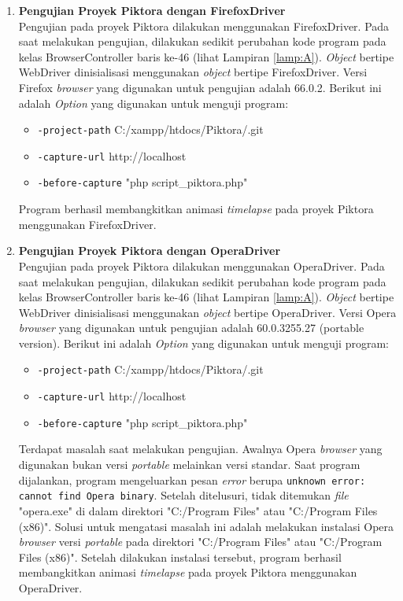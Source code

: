 \begin{enumerate}
\item \textbf{Pengujian Proyek Piktora dengan FirefoxDriver}\\
Pengujian pada proyek Piktora dilakukan menggunakan FirefoxDriver. Pada saat melakukan pengujian, dilakukan sedikit perubahan kode program pada kelas BrowserController baris ke-46 (lihat Lampiran \ref{lamp:A}). \textit{Object} bertipe WebDriver dinisialisasi menggunakan \textit{object} bertipe FirefoxDriver. Versi Firefox \textit{browser} yang digunakan untuk pengujian adalah 66.0.2. Berikut ini adalah \textit{Option} yang digunakan untuk menguji program:
\begin{itemize}
\item \texttt{-project-path} C:/xampp/htdocs/Piktora/.git
\item \texttt{-capture-url} http://localhost
\item \texttt{-before-capture} "php script\_piktora.php"
\end{itemize}
Program berhasil membangkitkan animasi \textit{timelapse} pada proyek Piktora menggunakan FirefoxDriver.


\item \textbf{Pengujian Proyek Piktora dengan OperaDriver}\\
Pengujian pada proyek Piktora dilakukan menggunakan OperaDriver. Pada saat melakukan pengujian, dilakukan sedikit perubahan kode program pada kelas BrowserController baris ke-46 (lihat Lampiran \ref{lamp:A}). \textit{Object} bertipe WebDriver dinisialisasi menggunakan \textit{object} bertipe OperaDriver. Versi Opera \textit{browser} yang digunakan untuk pengujian adalah 60.0.3255.27 (portable version). Berikut ini adalah \textit{Option} yang digunakan untuk menguji program:
\begin{itemize}
\item \texttt{-project-path} C:/xampp/htdocs/Piktora/.git
\item \texttt{-capture-url} http://localhost
\item \texttt{-before-capture} "php script\_piktora.php"
\end{itemize}

Terdapat masalah saat melakukan pengujian. Awalnya Opera \textit{browser} yang digunakan bukan versi \textit{portable} melainkan versi standar. Saat program dijalankan, program mengeluarkan pesan \textit{error} berupa \texttt{unknown error: cannot find Opera binary}. Setelah ditelusuri, tidak ditemukan \textit{file} "opera.exe" di dalam direktori "C:/Program Files" atau "C:/Program Files (x86)". Solusi untuk mengatasi masalah ini adalah melakukan instalasi Opera \textit{browser} versi \textit{portable} pada direktori "C:/Program Files" atau "C:/Program Files (x86)". Setelah dilakukan instalasi tersebut, program berhasil membangkitkan animasi \textit{timelapse} pada proyek Piktora menggunakan OperaDriver.


\end{enumerate}
